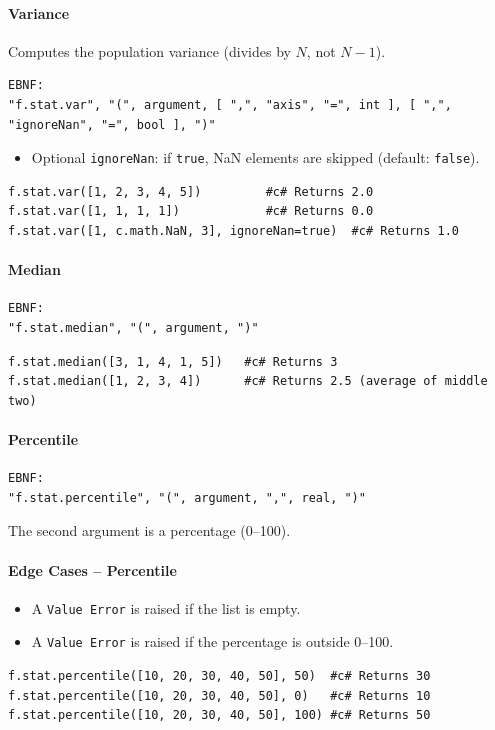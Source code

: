 \paragraph{Variance}
Computes the population variance (divides by $N$, not $N-1$).
\begin{verbatim}
EBNF:
"f.stat.var", "(", argument, [ ",", "axis", "=", int ], [ ",", "ignoreNan", "=", bool ], ")"
\end{verbatim}
\begin{itemize}
\item Optional \texttt{ignoreNan}: if \texttt{true}, NaN elements are skipped (default: \texttt{false}).
\end{itemize}
\begin{verbatim}
f.stat.var([1, 2, 3, 4, 5])         #c# Returns 2.0
f.stat.var([1, 1, 1, 1])            #c# Returns 0.0
f.stat.var([1, c.math.NaN, 3], ignoreNan=true)  #c# Returns 1.0
\end{verbatim}

\paragraph{Median}
\begin{verbatim}
EBNF:
"f.stat.median", "(", argument, ")"
\end{verbatim}
\begin{verbatim}
f.stat.median([3, 1, 4, 1, 5])   #c# Returns 3
f.stat.median([1, 2, 3, 4])      #c# Returns 2.5 (average of middle two)
\end{verbatim}

\paragraph{Percentile}
\begin{verbatim}
EBNF:
"f.stat.percentile", "(", argument, ",", real, ")"
\end{verbatim}
The second argument is a percentage (0--100).

\paragraph{Edge Cases -- Percentile}
\begin{itemize}
\item A \texttt{Value Error} is raised if the list is empty.
\item A \texttt{Value Error} is raised if the percentage is outside 0--100.
\end{itemize}
\begin{verbatim}
f.stat.percentile([10, 20, 30, 40, 50], 50)  #c# Returns 30
f.stat.percentile([10, 20, 30, 40, 50], 0)   #c# Returns 10
f.stat.percentile([10, 20, 30, 40, 50], 100) #c# Returns 50
\end{verbatim}

